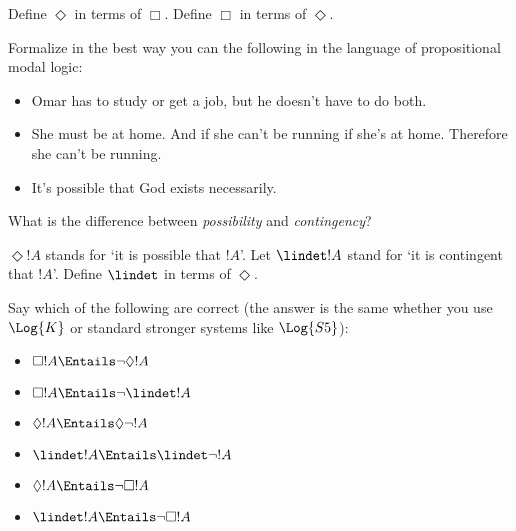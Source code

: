 \documentclass[../../../include/open-logic-section]{subfiles}
\begin{document}


\begin{prob}
    Define $\Diamond$ in terms of $\Box$. Define $\Box$ in terms of $\Diamond$.
\end{prob}

\begin{prob}
    Formalize in the best way you can the following in the language
    of propositional modal logic:
    \begin{itemize}
        \item Omar has to study or get a job, but he doesn't have to do both.
        \item She must be at home. And if she can't be running if she's at home.
        Therefore she can't be running.
        \item It's possible that God exists necessarily.
    \end{itemize}
\end{prob}

\begin{prob}
    What is the difference between \emph{possibility} and \emph{contingency}?

    $\Diamond !A$ stands for `it is possible that $!A$'. Let $\lindet !A$
    stand for `it is contingent that $!A$'. Define $\lindet$ in terms of $\Diamond$.

    Say which of the following are correct (the answer is the same whether
    you use $\Log{K}$ or standard stronger systems like $\Log{S5}$):
    \begin{itemize}
        \item $\Box !A \Entails \lnot \Diamond !A$
        \item $\Box !A \Entails \lnot \lindet !A$
        \item $\Diamond !A \Entails \Diamond \lnot !A$
        \item $\lindet !A \Entails \lindet \lnot !A$
        \item $\Diamond !A \Entails \lnot\Box !A$
        \item $\lindet !A \Entails \lnot\Box !A$
    \end{itemize}
\end{prob}
\end{document}
